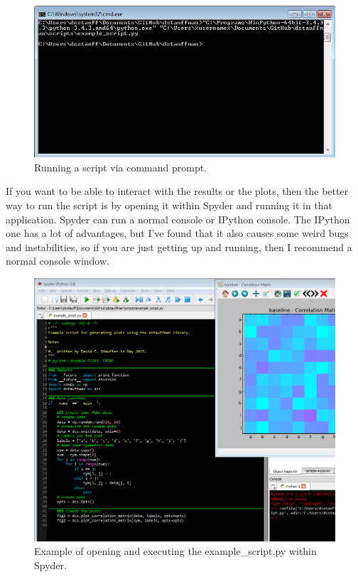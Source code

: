 \documentclass[12pt]{article}
\begin{document}
\begin{figure}[H]
    \centering
    \includegraphics[width=\textwidth]{Running_Code_via_cmd.png}
    \caption{Running a script via command prompt.}
    \label{fig:running_via_cmd}
\end{figure}

If you want to be able to interact with the results or the plots, then the better way to run the script is by opening it within Spyder and running it in that application.  Spyder can run a normal console or IPython console.  The IPython one has a lot of advantages, but I've found that it also causes some weird bugs and instabilities, so if you are just getting up and running, then I recommend a normal console window.

\begin{figure}[H]
    \centering
    \includegraphics[width=\textwidth]{Spyder_IDE_screenshot.png}
    \caption{Example of opening and executing the example\_script.py within Spyder.}
    \label{fig:spyder_example}
\end{figure}
\end{document}
